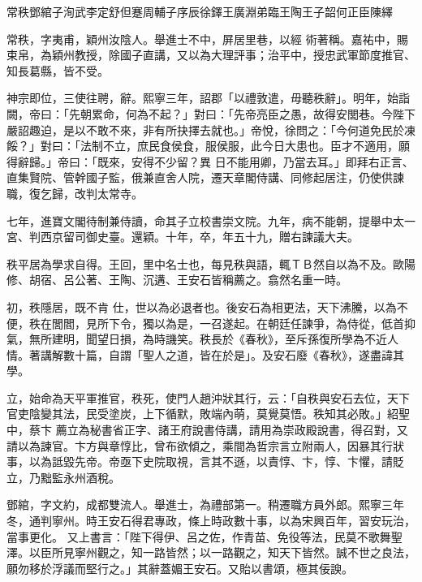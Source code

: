 
\begin{pinyinscope}

 常秩鄧綰子洵武李定舒但蹇周輔子序辰徐鐸王廣淵弟臨王陶王子韶何正臣陳繹



 常秩，字夷甫，穎州汝陰人。舉進士不中，屏居里巷，以經
 術著稱。嘉祐中，賜束帛，為穎州教授，除國子直講，又以為大理評事；治平中，授忠武軍節度推官、知長葛縣，皆不受。



 神宗即位，三使往聘，辭。熙寧三年，詔郡「以禮敦遣，毋聽秩辭」。明年，始詣闕，帝曰：「先朝累命，何為不起？」對曰：「先帝亮臣之愚，故得安閭巷。今陛下嚴詔趣迫，是以不敢不來，非有所抉擇去就也。」帝悅，徐問之：「今何道免民於凍餒？」對曰：「法制不立，庶民食侯食，服侯服，此今日大患也。臣才不適用，願得辭歸。」帝曰：「既來，安得不少留？異
 日不能用卿，乃當去耳。」即拜右正言、直集賢院、管幹國子監，俄兼直舍人院，遷天章閣侍講、同修起居注，仍使供諫職，復乞歸，改判太常寺。



 七年，進寶文閣待制兼侍讀，命其子立校書崇文院。九年，病不能朝，提舉中太一宮、判西京留司御史臺。還穎。十年，卒，年五十九，贈右諫議大夫。



 秩平居為學求自得。王回，里中名士也，每見秩與語，輒ＴＢ然自以為不及。歐陽修、胡宿、呂公著、王陶、沉遘、王安石皆稱薦之。翕然名重一時。



 初，秩隱居，既不肯
 仕，世以為必退者也。後安石為相更法，天下沸騰，以為不便，秩在閭閻，見所下令，獨以為是，一召遂起。在朝廷任諫爭，為侍從，低首抑氣，無所建明，聞望日損，為時譏笑。秩長於《春秋》，至斥孫復所學為不近人情。著講解數十篇，自謂「聖人之道，皆在於是」。及安石廢《春秋》，遂盡諱其學。



 立，始命為天平軍推官，秩死，使門人趙沖狀其行，云：「自秩與安石去位，天下官吏陰變其法，民受塗炭，上下循默，敗端內萌，莫覺莫悟。秩知其必敗。」紹聖中，蔡卞
 薦立為秘書省正字、諸王府說書侍講，請用為崇政殿說書，得召對，又請以為諫官。卞方與章惇比，曾布欲傾之，乘間為哲宗言立附兩人，因暴其行狀事，以為詆毀先帝。帝亟下史院取視，言其不遜，以責惇、卞，惇、卞懼，請貶立，乃黜監永州酒稅。



 鄧綰，字文約，成都雙流人。舉進士，為禮部第一。稍遷職方員外郎。熙寧三年冬，通判寧州。時王安石得君專政，條上時政數十事，以為宋興百年，習安玩治，當事更化。
 又上書言：「陛下得伊、呂之佐，作青苗、免役等法，民莫不歌舞聖澤。以臣所見寧州觀之，知一路皆然；以一路觀之，知天下皆然。誠不世之良法，願勿移於浮議而堅行之。」其辭蓋媚王安石。又貽以書頌，極其佞諛。




\end{pinyinscope}
